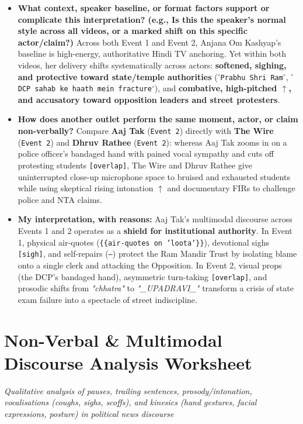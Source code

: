 \documentclass[10pt,a4paper]{article}
\begin{document}
\begin{itemize}
  \item \textbf{What context, speaker baseline, or format factors support or complicate this interpretation? (e.g., Is this the speaker's normal style across all videos, or a marked shift on this specific actor/claim?)}
Across both Event 1 and Event 2, Anjana Om Kashyap's baseline is high-energy, authoritative Hindi TV anchoring. Yet within both videos, her delivery shifts systematically across actors: \textbf{softened, sighing, and protective toward state/temple authorities} (\texttt{$^\circ$Prabhu Shri Ram$^\circ$}, \texttt{$^\circ$DCP sahab ke haath mein fracture$^\circ$}), and \textbf{combative, high-pitched \texttt{$\uparrow$}, and accusatory toward opposition leaders and street protesters}.\par\smallskip
  \item \textbf{How does another outlet perform the same moment, actor, or claim non-verbally?}
Compare \textbf{Aaj Tak} (\texttt{Event 2}) directly with \textbf{The Wire} (\texttt{Event 2}) and \textbf{Dhruv Rathee} (\texttt{Event 2}): whereas Aaj Tak zooms in on a police officer's bandaged hand with pained vocal sympathy and cuts off protesting students \texttt{[overlap]}, The Wire and Dhruv Rathee give uninterrupted close-up microphone space to bruised and exhausted students while using skeptical rising intonation \texttt{$\uparrow$} and documentary FIRs to challenge police and NTA claims.\par\smallskip
  \item \textbf{My interpretation, with reasons:}
Aaj Tak's multimodal discourse across Events 1 and 2 operates as a \textbf{shield for institutional authority}. In Event 1, physical air-quotes (\texttt{\{\{air-quotes on 'loota'\}\}}), devotional sighs \texttt{[sigh]}, and self-repairs (\texttt{---}) protect the Ram Mandir Trust by isolating blame onto a single clerk and attacking the Opposition. In Event 2, visual props (the DCP's bandaged hand), asymmetric turn-taking \texttt{[overlap]}, and prosodic shifts from \textit{"chhatra"} to \textit{"\_UPADRAVI\_"} transform a crisis of state exam failure into a spectacle of street indiscipline.\par\smallskip
\end{itemize}
\newpage
\section*{Non-Verbal \& Multimodal Discourse Analysis Worksheet}

\textit{Qualitative analysis of pauses, trailing sentences, prosody/intonation, vocalisations (coughs, sighs, scoffs), and kinesics (hand gestures, facial expressions, posture) in political news discourse}\par\smallskip
\end{document}
